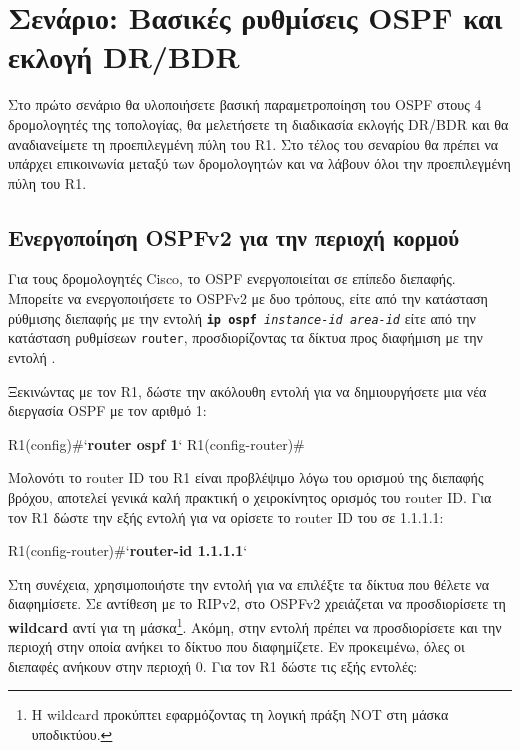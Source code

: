 \documentclass{EdipyLabs} %
\begin{document}
\section{Σενάριο: Βασικές ρυθμίσεις OSPF και εκλογή DR/BDR}
Στο πρώτο σενάριο θα υλοποιήσετε βασική παραμετροποίηση του OSPF στους 4 δρομολογητές της τοπολογίας, θα μελετήσετε τη διαδικασία εκλογής DR/BDR και θα αναδιανείμετε τη προεπιλεγμένη πύλη του R1. Στο τέλος του σεναρίου θα πρέπει να υπάρχει επικοινωνία μεταξύ των δρομολογητών και να λάβουν όλοι την προεπιλεγμένη πύλη του R1.

\subsection{Ενεργοποίηση OSPFv2 για την περιοχή κορμού}

Για τους δρομολογητές Cisco, το OSPF ενεργοποιείται σε επίπεδο διεπαφής. Μπορείτε να ενεργοποιήσετε το OSPFv2 με δυο τρόπους, είτε από την κατάσταση ρύθμισης διεπαφής με την εντολή \texttt{\textbf{ip ospf} \textit{instance-id} \textit{area-id}} είτε από την κατάσταση ρυθμίσεων \texttt{router}, προσδιορίζοντας τα δίκτυα προς διαφήμιση με την εντολή .

Ξεκινώντας με τον R1, δώστε την ακόλουθη εντολή για να δημιουργήσετε μια νέα διεργασία OSPF με τον αριθμό 1:

\begin{CommandBox}
R1(config)#`\textbf{router ospf 1}`
R1(config-router)#
\end{CommandBox}


Μολονότι το router ID του R1 είναι προβλέψιμο λόγω του ορισμού της διεπαφής βρόχου, αποτελεί γενικά καλή πρακτική ο χειροκίνητος ορισμός του router ID. Για τον R1 δώστε την εξής εντολή για να ορίσετε το router ID του σε 1.1.1.1:

\begin{CommandBox}
R1(config-router)#`\textbf{router-id 1.1.1.1}`
\end{CommandBox}

Στη συνέχεια, χρησιμοποιήστε την εντολή  για να επιλέξτε τα δίκτυα που θέλετε να διαφημίσετε. Σε αντίθεση με το RIPv2, στο OSPFv2 χρειάζεται να προσδιορίσετε τη \textbf{wildcard} αντί για τη μάσκα\footnote{Η wildcard προκύπτει εφαρμόζοντας τη λογική πράξη NOT στη μάσκα υποδικτύου.}. Ακόμη, στην εντολή πρέπει να προσδιορίσετε και την περιοχή στην οποία ανήκει το δίκτυο που διαφημίζετε. Εν προκειμένω, όλες οι διεπαφές ανήκουν στην περιοχή 0. Για τον R1 δώστε τις εξής εντολές:
\end{document}

